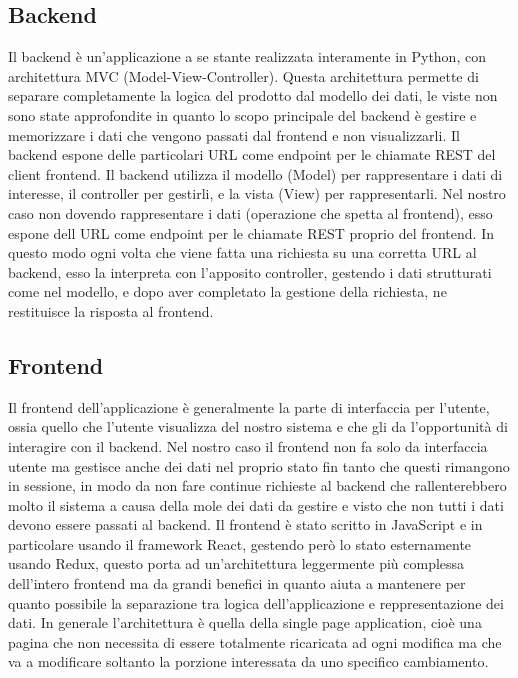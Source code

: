 \subsection{Backend}
Il backend è un'applicazione a se stante realizzata interamente in Python, con architettura MVC (Model-View-Controller). Questa architettura permette di separare completamente
la logica del prodotto dal modello dei dati, le viste non sono state approfondite in quanto lo scopo principale del backend è gestire e memorizzare i dati che vengono passati
dal frontend e non visualizzarli. Il backend espone delle particolari URL come endpoint per le chiamate REST del client frontend.
Il backend utilizza il modello (Model) per rappresentare i dati di interesse, il controller per gestirli, e la vista (View) per rappresentarli. Nel nostro caso non dovendo
rappresentare i dati (operazione che spetta al frontend), esso espone dell URL come endpoint per le chiamate REST proprio del frontend. In questo modo ogni volta che viene fatta
una richiesta su una corretta URL al backend, esso la interpreta con l'apposito controller, gestendo i dati strutturati come nel modello, e dopo aver completato la gestione
della richiesta, ne restituisce la risposta al frontend.

\subsection{Frontend}
Il frontend dell'applicazione è generalmente la parte di interfaccia per l'utente, ossia quello che l'utente visualizza del nostro sistema e che gli da l'opportunità di interagire
con il backend. Nel nostro caso il frontend non fa solo da interfaccia utente ma gestisce anche dei dati nel proprio stato fin tanto che questi rimangono in sessione, in modo da
non fare continue richieste al backend che rallenterebbero molto il sistema a causa della mole dei dati da gestire e visto che non tutti i dati devono essere passati al backend.
Il frontend è stato scritto in JavaScript e in particolare usando il framework React, gestendo però lo stato esternamente usando Redux, questo porta ad un'architettura leggermente
più complessa dell'intero frontend ma da grandi benefici in quanto aiuta a mantenere per quanto possibile la separazione tra logica dell'applicazione e reppresentazione dei dati.
In generale l'architettura è quella della single page application, cioè una pagina che non necessita di essere totalmente ricaricata ad ogni modifica ma che va a modificare
soltanto la porzione interessata da uno specifico cambiamento.

